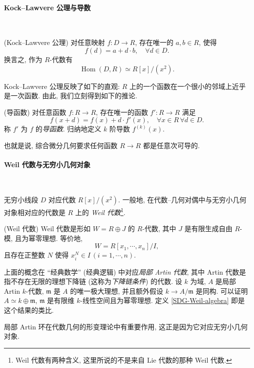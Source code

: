 \paragraph{Kock--Lawvere 公理与导数}

~

\begin{axiom}
	[label={Kock--Lawvere-D}]
	{(Kock--Lawvere 公理)}
	对任意映射 $f \colon D \to R$, 存在唯一的 $a,b\in R$,
	使得
	$$
	f(d) = a + d\cdot b,\quad\forall d\in D.
	$$
	换言之, 作为 $R$-代数有
	$$
	\operatorname{Hom}(D,R) \simeq R[x]/(x^2).
	$$
\end{axiom}

Kock--Lawvere 公理反映了如下的直观: $R$ 上的一个函数在一个很小的邻域上近乎是一次函数.
由此, 我们立刻得到如下的推论.

\begin{propdef}
	{(导函数)}
	对任意函数 $f\colon R\to R$, 存在唯一的函数 $f' \colon R \to R$ 满足
	$$
	f(x+d) = f(x) + d \cdot f'(x),\quad \forall x\in R\,\forall d\in D.
	$$
	称 $f'$ 为 $f$ 的\emph{导函数}. 归纳地定义 $k$ 阶导数 $f^{(k)}(x)$.
\end{propdef}

也就是说, 综合微分几何要求任何函数 $R\to R$ 都是任意次可导的.

\paragraph{Weil 代数与无穷小几何对象}

~

无穷小线段 $D$ 对应代数 $R[x]/(x^2)$. 一般地, 在代数--几何对偶中与无穷小几何对象相对应的代数是 $R$ 上的 \emph{Weil 代数}\footnote{Weil 代数有两种含义, 这里所说的不是来自 Lie 代数的那种 Weil 代数.}.
\begin{definition}
	[label={SDG-Weil-algebra}]
	{(Weil 代数)}
	Weil 代数是形如 $W = R \oplus J$ 的 $R$-代数,
	其中 $J$ 是有限生成自由 $R$-模,
	且为幂零理想. 等价地,
	$$
	W = R[x_1,\cdots,x_n]/I,
	$$
	且存在正整数 $N$ 使得 $x_i^N \in I\,(i=1,\cdots,n)$.
\end{definition}

\begin{remark}
	{}
	上面的概念在 ``经典数学'' (经典逻辑) 中对应\emph{局部 Artin 代数}, 其中 Artin 代数是指不存在无限的理想下降链 (这称为\emph{下降链条件}) 的代数.
	设 $k$ 为域, $A$ 是局部 Artin $k$-代数, $\mathfrak m$ 是 $A$ 的唯一极大理想, 并且额外假设 $k \to A/\mathfrak m$ 是同构.%
	可以证明\footnotemark $A \simeq k\oplus\mathfrak m$, $\mathfrak m$ 是有限维 $k$-线性空间且为幂零理想. 定义 \ref{SDG-Weil-algebra} 即是这个结果的类比.
	
	局部 Artin 环在代数几何的形变理论中有重要作用, 这正是因为它对应无穷小几何对象.
\end{remark}

